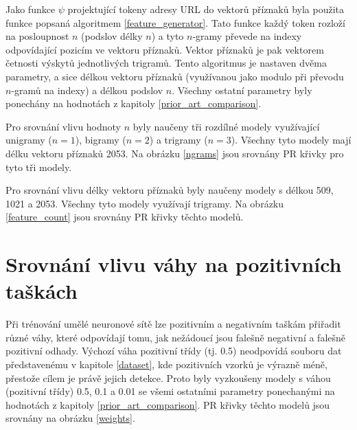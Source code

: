 Jako funkce \( \psi \) projektující tokeny adresy URL do vektorů příznaků byla použita funkce popsaná algoritmem \ref{feature_generator}. Tato funkce každý token rozloží na posloupnost \( n \) (podslov délky \( n \)) a tyto \( n \)-gramy převede na indexy odpovídající pozicím ve vektoru příznaků. Vektor příznaků je pak vektorem četnosti výskytů jednotlivých trigramů. Tento algoritmus je nastaven dvěma parametry, a sice délkou vektoru příznaků (využívanou jako modulo při převodu \( n \)-gramů na indexy) a délkou podslov \( n \). Všechny ostatní parametry byly ponechány na hodnotách z kapitoly \ref{prior_art_comparison}.

Pro srovnání vlivu hodnoty \( n \) byly naučeny tři rozdílné modely využívající unigramy (\( n = 1 \)), bigramy (\( n = 2 \)) a trigramy (\( n = 3 \)). Všechny tyto modely mají délku vektoru příznaků 2053. Na obrázku \ref{ngrams} jsou srovnány PR křivky pro tyto tři modely.


Pro srovnání vlivu délky vektoru příznaků byly naučeny modely s délkou 509, 1021 a 2053. Všechny tyto modely využívají trigramy. Na obrázku \ref{feature_count} jsou srovnány PR křivky těchto modelů.


\section{Srovnání vlivu váhy na pozitivních taškách}
Při trénování umělé neuronové sítě lze pozitivním a negativním taškám přiřadit různé váhy, které odpovídají tomu, jak nežádoucí jsou falešně negativní a falešně pozitivní odhady. Výchozí váha pozitivní třídy (tj. 0.5) neodpovídá souboru dat představenému v kapitole \ref{dataset}, kde pozitivních vzorků je výrazně méně, přestože cílem je právě jejich detekce. Proto byly vyzkoušeny modely s váhou (pozitivní třídy) 0.5, 0.1 a 0.01 se všemi ostatními parametry ponechanými na hodnotách z kapitoly \ref{prior_art_comparison}. PR křivky těchto modelů jsou srovnány na obrázku \ref{weights}.

